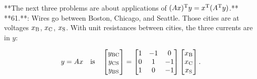 **The next three problems are about applications of \((Ax)^{\rm T}y=x^{\rm T}(A^{\rm T}y)\).**
**61.**: Wires go between Boston, Chicago, and Seattle. Those cities are at voltages \(x_{\rm B}\), \(x_{\rm C}\), \(x_{\rm S}\). With unit resistances between cities, the three currents are in \(y\):

\[y=Ax\quad\text{is}\quad\begin{bmatrix}y_{\rm BC}\\ y_{\rm CS}\\ y_{\rm BS}\end{bmatrix}=\begin{bmatrix}1&-1&0\\ 0&1&-1\\ 1&0&-1\end{bmatrix}\begin{bmatrix}x_{\rm B}\\ x_{\rm C}\\ x_{\rm S}\end{bmatrix}.\]